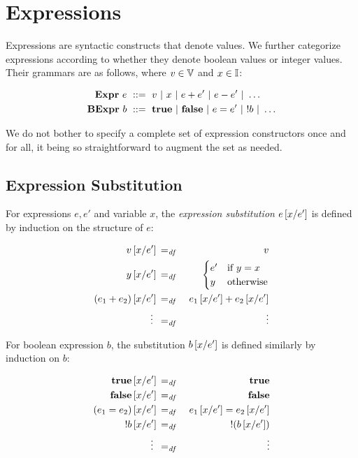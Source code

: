 \documentclass[11pt]{report}
\begin{document}



\section{Expressions} %
\label{sec:expressions}

Expressions are syntactic constructs that denote values. We further categorize expressions according to whether they denote boolean values or integer values. Their grammars are as follows, where $v \in \mathbb{V}$ and $x \in \mathbb{I}$: 

\begin{align*}
	\mathbf{Expr}~e & ~::=~ v ~|~ x ~|~ e + e' ~|~ e - e' ~|~ \ldots \\ 
	\mathbf{BExpr}~b & ~::=~ \mathbf{true} ~|~ \mathbf{false} ~|~ e = e' ~|~ !b ~|~ \ldots \\	
\end{align*}

We do not bother to specify a complete set of expression constructors once and for all, it being so straightforward to augment the set as needed.


\subsection{Expression Substitution} %
\label{sub:expression_substitution}

For expressions $e,e'$ and variable $x$, the \emph{expression
substitution} $e\left[x / e'\right]$ is defined by induction on the structure of $e$:

\begin{eqnarray*}
	v\left[x / e'\right] &\operatorname{\;=_{\mathit{df}}\;}& v\\
	y\left[x / e'\right] &\operatorname{\;=_{\mathit{df}}\;}& \begin{cases} e' & \text{if $y = x$} \\ 
	y & \text{otherwise}\end{cases} \\
	(e_1 + e_2)\left[x / e'\right] &\operatorname{\;=_{\mathit{df}}\;}& e_1\left[x / e'\right] + e_2\left[x / e'\right] \\
	\vdots~ &\operatorname{\;=_{\mathit{df}}\;}& ~\vdots
\end{eqnarray*}

For boolean expression $b$, the substitution $b\left[x / e'\right]$ is
defined similarly by induction on $b$:

\begin{eqnarray*}
	\mathbf{true} \left[x / e'\right] &\operatorname{\;=_{\mathit{df}}\;}& \mathbf{true} \\
	\mathbf{false} \left[x / e'\right] &\operatorname{\;=_{\mathit{df}}\;}& \mathbf{false} \\
	(e_1 = e_2)\left[x / e'\right] &\operatorname{\;=_{\mathit{df}}\;}& e_1\left[x / e'\right] = e_2\left[x / e'\right]\\
	!b\left[x / e'\right] &\operatorname{\;=_{\mathit{df}}\;}& !(b\left[x / e'\right]) \\
	\vdots~ &\operatorname{\;=_{\mathit{df}}\;}& ~\vdots
\end{eqnarray*}
\end{document}
